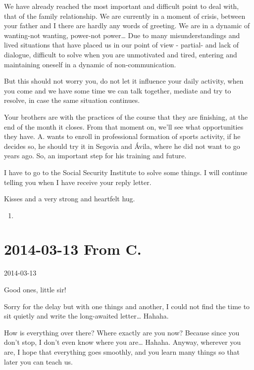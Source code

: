 \documentclass[]{book}
\begin{document}
We have already reached the most important and difficult point to deal with, that of the family relationship. We are currently in a moment of crisis, between your father and I there are hardly any words of greeting. We are in a dynamic of wanting-not wanting, power-not power\ldots{} Due to many misunderstandings and lived situations that have placed us in our point of view - partial- and lack of dialogue, difficult to solve when you are unmotivated and tired, entering and maintaining oneself in a dynamic of non-communication.

But this should not worry you, do not let it influence your daily activity, when you come and we have some time we can talk together, mediate and try to resolve, in case the same situation continues.

Your brothers are with the practices of the course that they are finishing, at the end of the month it closes. From that moment on, we'll see what opportunities they have. A. wants to enroll in professional formation of sports activity, if he decides so, he should try it in Segovia and Ávila, where he did not want to go years ago. So, an important step for his training and future.

I have to go to the Social Security Institute to solve some things. I will continue telling you when I have receive your reply letter.

Kisses and a very strong and heartfelt hug.

\begin{enumerate}
\def\labelenumi{\Alph{enumi}.}
\setcounter{enumi}{4}
\item
\end{enumerate}

\hypertarget{fromC20140313}{%
\section*{2014-03-13 From C.}\label{fromC20140313}}

2014-03-13

Good ones, little sir!

Sorry for the delay but with one things and another, I could not find the time to sit quietly and write the long-awaited letter\ldots{} Hahaha.

How is everything over there? Where exactly are you now? Because since you don't stop, I don't even know where you are\ldots{} Hahaha. Anyway, wherever you are, I hope that everything goes smoothly, and you learn many things so that later you can teach us.
\end{document}
